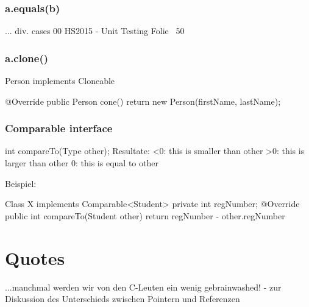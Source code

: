 \begin{multicols}{2}
\subsubsection{a.equals(b)}
... div. cases 00 HS2015 - Unit Testing Folie ~50

\subsubsection{a.clone()}

	Person implements Cloneable {

		@Override
		public Person cone() {
			return new Person(firstName, lastName);
		}
	}

\subsubsection{Comparable interface}

	int compareTo(Type other);
	Resultate: 
	<0: this is smaller than other
	>0: this is larger than other
	0: this is equal to other


	Beispiel:

	Class X implements Comparable<Student> {
		private int regNumber;
		@Override
		public int compareTo(Student other) {
			return regNumber - other.regNumber
		}
	}
\end{multicols}


\section{Quotes}
	...manchmal werden wir von den C-Leuten ein wenig gebrainwashed!
	- zur Diskussion des Unterschieds zwischen Pointern und Referenzen



